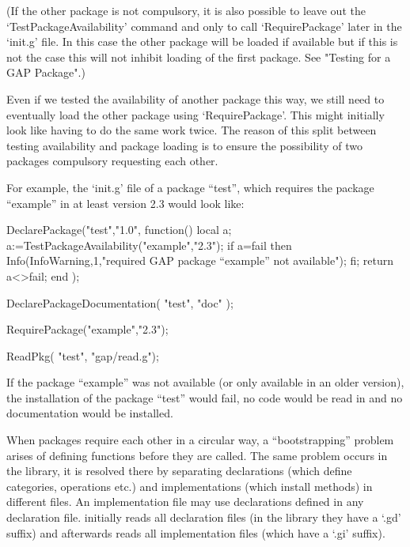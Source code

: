 (If the other {\GAP} package is not compulsory, it is also possible to leave
out the `TestPackageAvailability' command and only to call `RequirePackage'
later in the `init.g' file. In this case the other {\GAP} package will be
loaded if available but if this is not the case this will not inhibit
loading of the first package. See "Testing for a GAP Package".)

Even if we tested the availability of another package this way, we
still  need to eventually load the other package using
`RequirePackage'. This might initially look like having to do the same
work twice. The reason of this split between testing availability and
package loading is to ensure the possibility of two {\GAP} packages
compulsory requesting each other.

For example, the `init.g' file of a {\GAP} package ``test'', which requires
the {\GAP} package ``example'' in at least version 2.3 would look like:

\begintt
DeclarePackage("test","1.0",
  function()
  local a;
    a:=TestPackageAvailability("example","2.3");
    if a=fail then
      Info(InfoWarning,1,"required GAP package ``example'' not available");
    fi;
    return a<>fail;
  end
  );

DeclarePackageDocumentation( "test", "doc" );

RequirePackage("example","2.3");

ReadPkg( "test", "gap/read.g");
\endtt

If the {\GAP} package ``example'' was not available (or only available in an
older version), the installation of the package ``test'' would fail, no code
would be read in and no documentation would be installed.


When  {\GAP}  packages  require  each other    in  a  circular  way, a
``bootstrapping'' problem arises of defining functions before they are
called. The same  problem occurs in the  library, it is resolved there
by separating declarations (which  define categories, operations etc.)
and   implementations (which install methods)   in different files. An
implementation  file may use   declarations defined in any declaration
file.   {\GAP} initially reads all  declaration  files (in the library
they have a `.gd' suffix) and afterwards reads all implementation files
(which have a `.gi' suffix).

